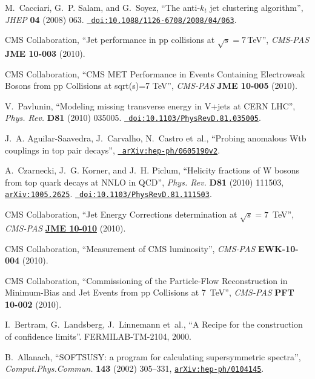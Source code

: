 \begin{thebibliography}{10}
M.~Cacciari, G.~P. Salam, and G.~Soyez, ``{The anti-{$k_t$} jet clustering
  algorithm}'', {\em JHEP} {\bf 04} (2008)
063.
  \href{http://dx.doi.org/10.1088/1126-6708/2008/04/063}{{\tt
  doi:10.1088/1126-6708/2008/04/063}}.

{CMS Collaboration}, ``Jet performance in pp collisions at $\sqrt{s} =
  7$\,TeV'', {\em CMS-PAS} {\bf JME 10-003} (2010).

{CMS Collaboration}, ``CMS MET Performance in Events Containing Electroweak
  Bosons from pp Collisions at sqrt(s)=7 TeV'', {\em CMS-PAS} {\bf JME 10-005}
  (2010).

V.~Pavlunin, ``{Modeling missing transverse energy in V+jets at CERN LHC}'',
  {\em Phys. Rev.} {\bf D81} (2010)
035005.
  \href{http://dx.doi.org/10.1103/PhysRevD.81.035005}{{\tt
  doi:10.1103/PhysRevD.81.035005}}.

J.~A. Aguilar-Saavedra, J.~Carvalho, N.~Castro{ et~al.}, ``Probing anomalous
  Wtb couplings in top pair decays'',
  \href{http://www.arXiv.org/abs/hep-ph/0605190v2}{{\tt
  arXiv:hep-ph/0605190v2}}.

A.~Czarnecki, J.~G. Korner, and J.~H. Piclum, ``{Helicity fractions of W bosons
  from top quark decays at NNLO in QCD}'', {\em Phys. Rev.} {\bf D81} (2010)
  111503,
\href{http://www.arXiv.org/abs/1005.2625}{{\tt arXiv:1005.2625}}.
  \href{http://dx.doi.org/10.1103/PhysRevD.81.111503}{{\tt
  doi:10.1103/PhysRevD.81.111503}}.

{CMS Collaboration}, ``Jet Energy Corrections determination at
  {$\sqrt{s}=7$}~TeV'', {\em CMS-PAS} {\bf
  \href{http://cdsweb.cern.ch/record/1308178}{JME 10-010}} (2010).

{CMS Collaboration}, ``Measurement of CMS luminosity'', {\em CMS-PAS} {\bf
  EWK-10-004} (2010).

{CMS Collaboration}, ``Commissioning of the Particle-Flow Reconstruction in
  Minimum-Bias and Jet Events from pp Collisions at 7~TeV'', {\em CMS-PAS} {\bf
  PFT 10-002} (2010).

I.~Bertram, G.~Landsberg, J.~Linnemann{ et~al.}, ``A Recipe for the
  construction of confidence limits''. FERMILAB-TM-2104, 2000.

B.~Allanach, ``SOFTSUSY: a program for calculating supersymmetric spectra'',
  {\em Comput.Phys.Commun.} {\bf 143} (2002) 305--331,
  \href{http://www.arXiv.org/abs/hep-ph/0104145}{{\tt arXiv:hep-ph/0104145}}.


\end{thebibliography}
